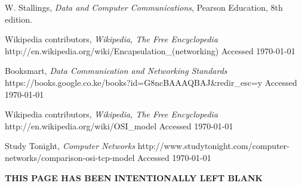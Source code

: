 \documentclass[a4paper,12pt]{report}
\begin{document}
\begin{thebibliography}{9}

 W. Stallings,
  \emph{Data and Computer Communications},
  Pearson Education,
  8th edition.

  Wikipedia contributors,
  \emph{Wikipedia, The Free Encyclopedia}
  http://en.wikipedia.org/wiki/Encapsulation\_(networking)
  Accessed \today
  
  Booksmart,
  \emph{Data Communication and Networking Standards}
  https://books.google.co.ke/books?id=G8ncBAAAQBAJ\&redir\_esc=y
  Accessed \today

  Wikipedia contributors,
  \emph{Wikipedia, The Free Encyclopedia}
  http://en.wikipedia.org/wiki/OSI\_model
  Accessed \today

  Study Tonight,
  \emph{Computer Networks}
  http://www.studytonight.com/computer-networks/comparison-osi-tcp-model
  Accessed \today  



\end{thebibliography}


\newpage
  \thispagestyle{empty}
  	\vspace*{\fill}
		\begin{center} 
		\textbf{THIS PAGE HAS BEEN INTENTIONALLY LEFT BLANK}
		\end{center}
	\vspace*{\fill}





 
\end{document}
